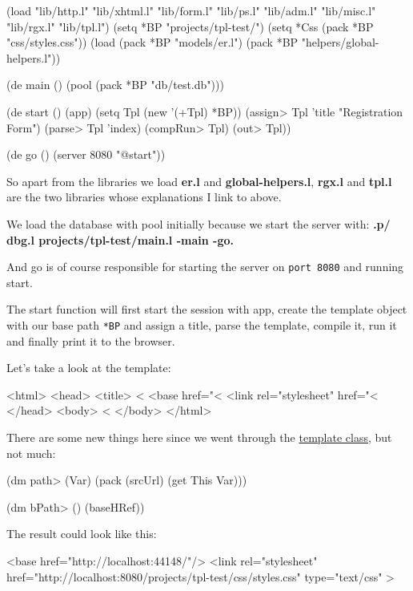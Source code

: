 \begin{wideverbatim}
(load "lib/http.l" "lib/xhtml.l" "lib/form.l" "lib/ps.l"
 "lib/adm.l" "lib/misc.l" "lib/rgx.l" "lib/tpl.l")
(setq *BP "projects/tpl-test/")
(setq *Css (pack *BP "css/styles.css"))
(load 
 (pack *BP "models/er.l") 
 (pack *BP "helpers/global-helpers.l"))

(de main () 
  (pool (pack *BP "db/test.db")))
    
(de start ()
  (app)
  (setq Tpl (new '(+Tpl) *BP))
  (assign> Tpl 'title "Registration Form")
  (parse> Tpl 'index)
  (compRun> Tpl)
  (out> Tpl))                  

(de go () 
   (server 8080 "@start"))
\end{wideverbatim}

So apart from the libraries we load \textbf{er.l} and \textbf{global-helpers.l},
\textbf{rgx.l} and \textbf{tpl.l} are the two libraries whose explanations I link to
above.

We load the database with pool initially because we start the server
with: \textbf{.p/ dbg.l projects/tpl-test/main.l -main -go.}

And go is of course responsible for starting the server on
\texttt{port 8080} and running start.

The start function will first start the session with app, create the
template object with our base path \texttt{*BP} and assign a title,
parse the template, compile it, run it and finally print it to the
browser.

Let's take a look at the template:

\begin{wideverbatim}
<html>
<head>
<title> <%
<base href="<%
<link rel="stylesheet" href="<%
</head>
<body>
<%
</body>
</html>
\end{wideverbatim}

There are some new things here since we went through the
\href{http://www.prodevtips.com/2008/07/17/templating-in-pico-lisp/}{template
  class}, but not much:

\begin{wideverbatim}
(dm path> (Var)
   (pack (srcUrl) (get This Var)))

(dm bPath> ()
   (baseHRef))
\end{wideverbatim}

The result could look like this:


\begin{wideverbatim}
<base href="http://localhost:44148/"/>
<link rel="stylesheet"
      href="http://localhost:8080/projects/tpl-test/css/styles.css" 
type="text/css" >
\end{wideverbatim}

